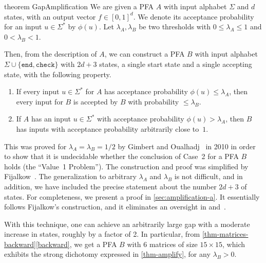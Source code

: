 \documentclass[a4paper,cleveref, autoref, thm-restate]{lipics-v2021}
\begin{document}
\begin{restatable}
  {theorem}
  {GapAmplification}
  \label{thm-amplify}
  We are given a PFA $A$ with input alphabet $\Sigma$ and $d$ states,
  with an output vector $f\in [0,1]^d$.
  We denote its
acceptance probability for an input $u\in \Sigma^*$ 
by $\phi(u)$.
Let $\lambda_A,\lambda_B$ be two thresholds with
$0\le\lambda_A \le1$ and
$0<\lambda_B <1$.

Then, from the description of $A$, we can construct a PFA $B$ with input alphabet
$\Sigma\cup\{\mathtt{end},\mathtt{check}\}$
with $2d+3$ states, a single
start state and a single accepting state,
with the following
property.
\begin{enumerate}[1.]
\item
    If every input $u\in \Sigma^*$ for $A$ has acceptance probability $\phi(u)\le\lambda_A$,
then every input for $B$ is accepted by $B$ with probability $\le\lambda_B$.
\item If $A$ has an input $u\in \Sigma^*$ with acceptance probability $\phi(u)>\lambda_A$,
  then $B$ has inputs with acceptance probability arbitrarily close to~$1$.
\end{enumerate}
\end{restatable}

\medskip

This was proved
for $\lambda_A=\lambda_B=1/2$ by
Gimbert and Oualhadj~\cite{gimbert-oualhadj-2010:PFA}
in 2010
in order to show that
it is undecidable
whether the conclusion of Case~2 %
for a PFA $B$ holds (the ``Value~1 Problem'').
The construction and proof was simplified by
Fijalkow~\cite{Fijalkow-2017-SIGLOG}.
The generalization to arbitrary
$\lambda_A$ and $\lambda_B$ is not difficult,
and in addition,
we have included the precise statement about the number $2d+3$ of states.
%
For completeness, we present a proof in
\autoref{sec:amplification-a}.
It essentially follows
Fijalkow's construction, and
it eliminates an oversight
in
\cite{gimbert-oualhadj-2010:PFA}
and~\cite{Fijalkow-2017-SIGLOG}.

With this technique, one can achieve an arbitrarily large gap
with a moderate increase in states, roughly by a factor of 2.
In particular, from
\autoref{thm-matrices-backward}\ref{backward}, we get a PFA $B$
with 6 matrices of size $15\times 15$, which exhibits the strong
dichotomy expressed in
\autoref{thm-amplify},
for any $\lambda_B>0$.
\end{document}
